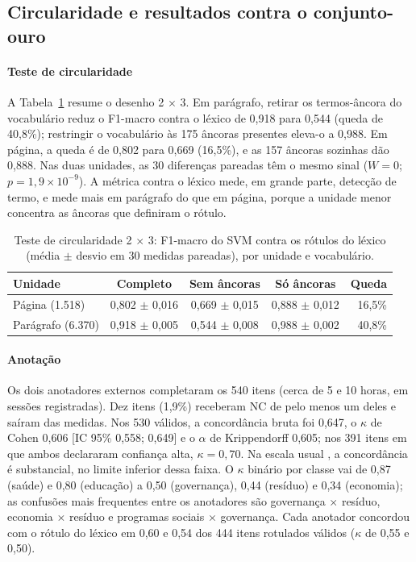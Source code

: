 \documentclass[fleqn,10pt]{SelfArx}
\begin{document}
\subsection{Circularidade e resultados contra o conjunto-ouro}
\label{sec:ouro}

\paragraph{Teste de circularidade} A Tabela~\ref{tab:circ} resume o desenho 2 $\times$ 3. Em parágrafo, retirar os termos-âncora do vocabulário reduz o F1-macro contra o léxico de 0,918 para 0,544 (queda de 40,8\%); restringir o vocabulário às 175 âncoras presentes eleva-o a 0,988. Em página, a queda é de 0,802 para 0,669 (16,5\%), e as 157 âncoras sozinhas dão 0,888. Nas duas unidades, as 30 diferenças pareadas têm o mesmo sinal ($W = 0$; $p = 1{,}9 \times 10^{-9}$). A métrica contra o léxico mede, em grande parte, detecção de termo, e mede mais em parágrafo do que em página, porque a unidade menor concentra as âncoras que definiram o rótulo.

\begin{table}[ht]
\caption{Teste de circularidade 2 $\times$ 3: F1-macro do SVM contra os rótulos do léxico (média $\pm$ desvio em 30 medidas pareadas), por unidade e vocabulário.}
\label{tab:circ}
\centering
\small
\begin{tabular}{lcccr}
\toprule
Unidade & Completo & Sem âncoras & Só âncoras & Queda \\
\midrule
Página (1.518) & 0,802 $\pm$ 0,016 & 0,669 $\pm$ 0,015 & 0,888 $\pm$ 0,012 & 16,5\% \\
Parágrafo (6.370) & 0,918 $\pm$ 0,005 & 0,544 $\pm$ 0,008 & 0,988 $\pm$ 0,002 & 40,8\% \\
\bottomrule
\end{tabular}
\end{table}

\paragraph{Anotação} Os dois anotadores externos completaram os 540 itens (cerca de 5 e 10 horas, em sessões registradas). Dez itens (1,9\%) receberam NC de pelo menos um deles e saíram das medidas. Nos 530 válidos, a concordância bruta foi 0,647, o $\kappa$ de Cohen 0,606 [IC 95\% 0,558; 0,649] e o $\alpha$ de Krippendorff 0,605; nos 391 itens em que ambos declararam confiança alta, $\kappa = 0{,}70$. Na escala usual \cite{landis1977}, a concordância é substancial, no limite inferior dessa faixa. O $\kappa$ binário por classe vai de 0,87 (saúde) e 0,80 (educação) a 0,50 (governança), 0,44 (resíduo) e 0,34 (economia); as confusões mais frequentes entre os anotadores são governança $\times$ resíduo, economia $\times$ resíduo e programas sociais $\times$ governança. Cada anotador concordou com o rótulo do léxico em 0,60 e 0,54 dos 444 itens rotulados válidos ($\kappa$ de 0,55 e 0,50).
\end{document}

